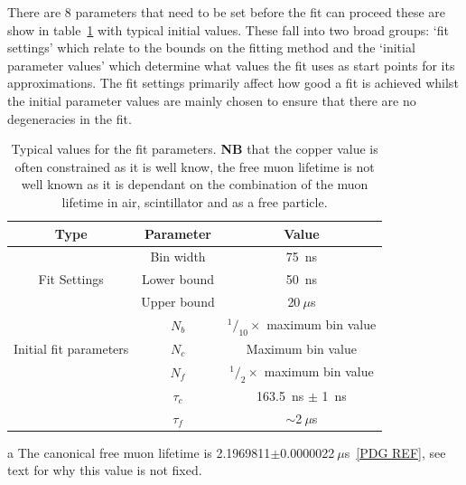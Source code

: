 \documentclass[]{article}
\newcommand{\ms}{$~\mu$s}
\begin{document}
There are 8 parameters that need to be set before the fit can proceed these are show in table~\ref{tab:typical_fit_values} with typical initial values. These fall into two broad groups: `fit settings' which relate to the bounds on the fitting method and the `initial parameter values' which determine what values the fit uses as start points for its approximations. The fit settings primarily affect how good a fit is achieved whilst the initial parameter values are mainly chosen to ensure that there are no degeneracies in the fit. 

\begin{table}
    \begin{center}
	    \begin{threeparttable}
		    \begin{tabular}{c | c | c }
		        Type & Parameter   & Value \\
		        \hline
		        \multirow{3}{*}{Fit Settings} & Bin width   & 75~ns \\
		                                      & Lower bound & 50~ns \\
		                                      & Upper bound & 20\ms \\
		        \hline
		        \multirow{3}{*}{Initial fit parameters} 
		                    & $N_{b}$     & $^1/_{10} \times$ maximum bin value \\
		                    & $N_{c}$     & Maximum bin value\\
		                    & $N_{f}$     & $^1/_{2} \times$ maximum bin value\\
		                    & $\tau_{c}$  & 163.5~ns $\pm$ 1~ns\\
		                    & $\tau_{f}$  & $\sim$2\ms\tnote{a}\\
		    \end{tabular}
		    \caption{Typical values for the fit parameters. \textbf{NB} that the copper value is often constrained as it is well know, the free muon lifetime is not well known as it is dependant on the combination of the muon lifetime in air, scintillator and as a free particle.}
		    \begin{tablenotes}
		        \item [a] The canonical free muon lifetime is 2.1969811$\pm$0.0000022\ms~\ref{PDG REF}, see text for why this value is not fixed.
		    \end{tablenotes}
		    \label{tab:typical_fit_values}
	    \end{threeparttable}
    \end{center}
\end{table}
\end{document}
